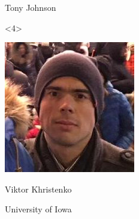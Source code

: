 \documentclass{beamer}
\begin{document}
\begin{frame}{}
\begin{onlyenv}
\begin{minipage}{3 cm}
\begin{center}
{\begin{minipage}{2.3 cm}
\centering Tony Johnson
\end{minipage}\hspace{-3.2 cm}}
\end{center}
\end{minipage}\hspace{1 cm}\vspace{3.5 cm}
\end{onlyenv}
\begin{onlyenv}<4>
\vspace{-3.5 cm}\hfill\begin{minipage}{3 cm}
\begin{center}
\includegraphics[width=2 cm]{viktor.jpg}

Viktor Khristenko

{\small University of Iowa}
\end{center}
\end{minipage}\hspace{1 cm}\vspace{3.5 cm}
\end{onlyenv}

\end{frame}
\end{document}
